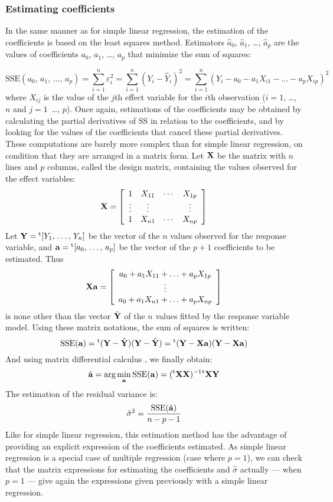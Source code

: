\subsubsection{Estimating coefficients}

In the same manner as for simple linear regression, the estimation of the coefficients is based on the least squares method. Estimators $\hat{a}_0$,
$\hat{a}_1$, \ldots, $\hat{a}_p$ are the values of coefficients $a_0$, $a_1$, \ldots, $a_p$ that minimize the sum of squares:

\[
\mathrm{SSE}(a_0,\,a_1,\,\ldots,\,a_p)=\sum_{i=1}^n\varepsilon_i^2
=\sum_{i=1}^n(Y_i-\hat{Y}_i)^2
=\sum_{i=1}^n(Y_i-a_0-a_1X_{i1}-\ldots-a_pX_{ip})^2
\]
where $X_{ij}$ is the value of the $j$th effect variable for the $i$th observation ($i=1$, \ldots,
$n$ and $j=1$\, \ldots, $p$). Once again, estimations of the coefficients may be obtained by calculating the partial derivatives of SS in relation to the coefficients, and by looking for the values of the coefficients that cancel these partial derivatives. These computations are barely more complex than for simple linear regression, on condition that they are arranged in a matrix form. 
Let $\mathbf{X}$ be the matrix with $n$ lines and $p$ columns, called the design matrix, containing the values observed for the effect variables:
\[
\matx{X}=\left[
\begin{array}{cccc}
1      & X_{11} & \cdots & X_{1p}\\ %
\vdots & \vdots &        & \vdots\\ %
1      & X_{n1} & \cdots & X_{np}\\ %
\end{array}
\right]
\]
Let $\mathbf{Y}={}^{\mathrm{t}}[Y_1,\,\ldots,\,Y_n]$ be the vector of the $n$ values observed for the response variable, and $\mathbf{a}={}^{\mathrm{t}}[a_0,\,\ldots,\,a_p]$ be the vector of the $p+1$ coefficients to be estimated. Thus
\[
\matx{X}\vect{a}=\left[
\begin{array}{c}
a_0+a_1X_{11}+\ldots+a_pX_{1p}\\ %
\vdots\\ %
a_0+a_1X_{n1}+\ldots+a_pX_{np}\\ %
\end{array}
\right]
\]
is none other than the vector $\hat{\mathbf{Y}}$  of the $n$ values fitted by the response variable model. Using these matrix notations, the sum of squares is written:
\[
\mathrm{SSE}(\mathbf{a})={}^{\mathrm{t}}(\mathbf{Y}-\hat{\mathbf{Y}})
(\mathbf{Y}-\hat{\mathbf{Y}})={}^{\mathrm{t}}(\mathbf{Y}-\mathbf{X}\mathbf{a})
(\mathbf{Y}-\mathbf{X}\mathbf{a})
\]
And using matrix differential calculus \citep{magnus07}, we finally obtain:
\[
\hat{\mathbf{a}}=\arg\min_{\mathbf{a}}\mathrm{SSE}(\mathbf{a})
=({}^{\mathrm{t}}\mathbf{X}\mathbf{X})^{-1}{}^{\mathrm{t}}\mathbf{X}\mathbf{Y}
\]
The estimation of the residual variance is:
\[
\hat{\sigma}^2=\frac{\mathrm{SSE}(\hat{\mathbf{a}})}{n-p-1}
\]
Like for simple linear regression, this estimation method has the advantage of providing an explicit expression of the coefficients estimated. As simple linear regression is a special case of multiple regression (case where $p=1$), we can check that the matrix expressions for estimating the coefficients and $\hat{\sigma}$ actually --- when $p=1$ --- give again the expressions given previously with a simple linear regression.

